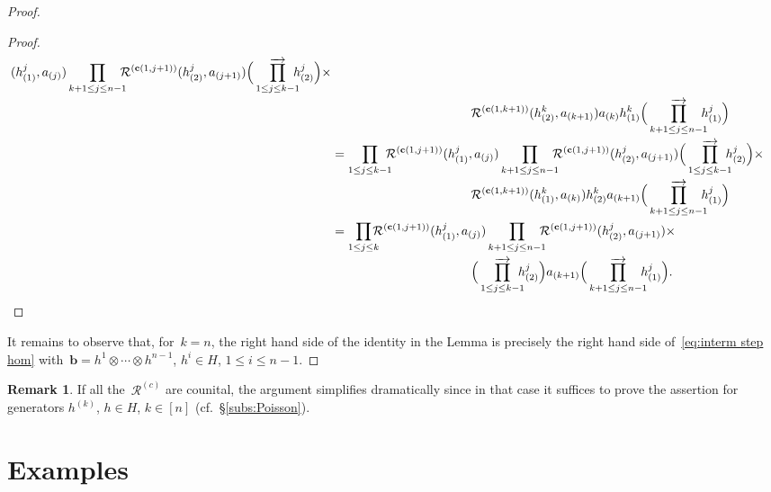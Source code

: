 \documentclass[12pt, reqno]{amsart}
\theoremstyle{definition}
\newtheorem{remark}[theorem]{Remark}
\newcommand{\ascprod}{\mathop{\overrightarrow{\prod}}}
\numberwithin{equation}{section}
\newcommand{\tensor}{\otimes}
\begin{document}
\begin{proof}
\begin{proof}
\begin{align*}
(h^j_{(1)},a_{(j)})\prod_{k+1\le j\le n-1}\!\!\!\!
\mathcal R^{(\mathbf c(1,j+1))}(h^j_{(2)},a_{(j+1)})
\Big(\ascprod_{1\le j\le k-1}\!\!\!\! h^j_{(2)}\Big)
\times\\
&\mskip200mu\mathcal R^{(\mathbf c(1,k+1))}(h^k_{(2)},a_{(k+1)})
a_{(k)}h^k_{(1)}\Big(\ascprod_{k+1\le j\le n-1}\!\!\!\!h^j_{(1)}\Big)\\
&=\prod_{1\le j\le k-1}\!\!\!\!\mathcal R^{(\mathbf c(1,j+1))}
(h^j_{(1)},a_{(j)})\prod_{k+1\le j\le n-1}\!\!\!\!
\mathcal R^{(\mathbf c(1,j+1))}(h^j_{(2)},a_{(j+1)})
\Big(\ascprod_{1\le j\le k-1}\!\!\!\! h^j_{(2)}\Big)
\times\\
&\mskip200mu\mathcal R^{(\mathbf c(1,k+1))}(h^k_{(1)},a_{(k)})
h^k_{(2)} a_{(k+1)}\Big(\ascprod_{k+1\le j\le n-1}\!\!\!\!h^j_{(1)}\Big)
\\
&=\prod_{1\le j\le k}\!\!\!\!\mathcal R^{(\mathbf c(1,j+1))}
(h^j_{(1)},a_{(j)})\prod_{k+1\le j\le n-1}\!\!\!\!
\mathcal R^{(\mathbf c(1,j+1))}(h^j_{(2)},a_{(j+1)})\times\\
&\mskip200mu
\Big(\ascprod_{1\le j\le k-1}\!\!\!\! h^j_{(2)}\Big)
a_{(k+1)}\Big(\ascprod_{k+1\le j\le n-1}\!\!\!\!h^j_{(1)}\Big).\qedhere
\end{align*}
\end{proof}
It remains to observe that, for~$k=n$, the 
right hand side of the identity in the Lemma is
precisely the right hand side of~\eqref{eq:interm step hom} with~$\mathbf b=h^1\tensor \cdots\tensor h^{n-1}$,
$h^i\in H$, $1\le i\le n-1$. 
\end{proof}
\begin{remark}
If all the~$\mathcal R^{(c)}$ are counital, the argument simplifies dramatically since in that case it suffices to prove the assertion for generators $h^{(k)}$, $h\in H$, $k\in[n]$ (cf.~\S\ref{subs:Poisson}).
\end{remark}

\section{Examples}
\end{document}
